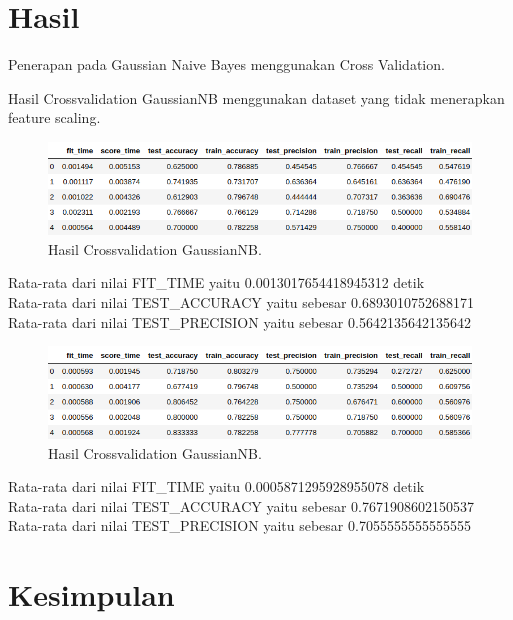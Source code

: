\documentclass[conference]{IEEEtran}
\begin{document}
\section{Hasil}

Penerapan pada Gaussian Naive Bayes menggunakan Cross Validation.

Hasil Crossvalidation GaussianNB menggunakan dataset yang tidak menerapkan feature scaling. \\

\begin{figure}[htbp]
	\includegraphics[width=\linewidth]{img/hasil1.png}
	\caption{Hasil Crossvalidation GaussianNB.}
\end{figure}

Rata-rata dari nilai FIT\_TIME yaitu 0.0013017654418945312 detik\\

Rata-rata dari nilai TEST\_ACCURACY yaitu sebesar 0.6893010752688171\\

Rata-rata dari nilai TEST\_PRECISION yaitu sebesar 0.5642135642135642\\

\begin{figure}[htbp]
	\includegraphics[width=\linewidth]{img/hasil2.png}
	\caption{Hasil Crossvalidation GaussianNB.}
\end{figure}

Rata-rata dari nilai FIT\_TIME yaitu 0.0005871295928955078 detik\\

Rata-rata dari nilai TEST\_ACCURACY yaitu sebesar 0.7671908602150537\\

Rata-rata dari nilai TEST\_PRECISION yaitu sebesar 0.7055555555555555\\

\section{Kesimpulan}
\end{document}
